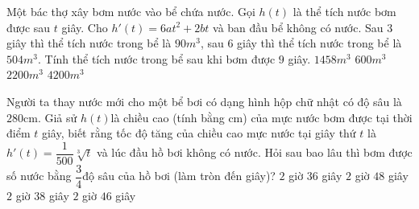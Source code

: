 \begin{ex}%
	Một bác thợ xây bơm nước vào bể chứa nước. Gọi $h\left( t \right)$ là thể tích nước bơm được sau $t$ giây. Cho ${h}'\left( t \right)=6at^2+2bt$ và ban đầu bể không có nước. Sau 3 giây thì thể tích nước trong bể là $90m^3$, sau $6$ giây thì thể tích nước trong bể là $504m^3$. Tính thể tích nước trong bể sau khi bơm được $9$ giây.
	\choice
	{\True $1458m^3$}
	{$600m^3$}
	{$2200m^3$}
	{$4200m^3$}
\end{ex}
\begin{ex}%
	Người ta thay nước mới cho một bể bơi có dạng hình hộp chữ nhật có độ sâu là $280$cm. Giả sử $h\left( t \right)$là chiều cao (tính bằng cm) của mực nước bơm được tại thời điểm $t$ giây, biết rằng tốc độ tăng của chiều cao mực nước tại giây thứ $t$ là ${h}'(t)=\dfrac{1}{500}\sqrt[3]{t}$ và lúc đầu hồ bơi không có nước. Hỏi sau bao lâu thì bơm được số nước bằng $\dfrac{3}{4}$độ sâu của hồ bơi (làm tròn đến giây)?
	\choice
	{$2$ giờ $36$ giây}
	{$2$ giờ $48$ giây}
	{\True $2$ giờ $38$ giây}
	{$2$ giờ $46$ giây}
\end{ex}

